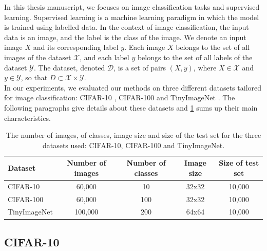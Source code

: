In this thesis manuscript, we focuses on image classification tasks and
supervised learning. Supervised learning is a machine learning paradigm in which
the model is trained using labelled data. In the context of image
classification, the input data is an image, and the label is the class of the
image. We denote an input image $X$ and its corresponding label $y$. Each image
$X$ belongs to the set of all images of the dataset $\mathcal{X}$, and each
label $y$ belongs to the set of all labels of the dataset $\mathcal{Y}$. The
dataset, denoted $\mathcal{D}$, is a set of pairs $(X, y)$, where $X \in
  \mathcal{X}$ and $y \in \mathcal{Y}$, so that $D \subset \mathcal{X} \times
  \mathcal{Y}$. \\

In our experiments, we evaluated our methods on three different datasets
tailored for image classification: CIFAR-10 \cite{CIFARdataset}, CIFAR-100
\cite{CIFARdataset} and TinyImageNet \cite{TinyImageNet}. The following
paragraphs give details about these datasets and \cref{tab:dlo:datasets} sums
up their main characteristics.\\

\begin{table}[ht!]
  \centering
  \begin{tabular}{lcccc}
    \toprule
    \textbf{Dataset}    & \textbf{Number of images} & \textbf{Number of classes} &
    \textbf{Image size} & \textbf{Size of test set}                                               \\
    \hline
    CIFAR-10            & 60,000                    & 10                         & 32x32 & 10,000 \\
    CIFAR-100           & 60,000                    & 100                        & 32x32 & 10,000 \\
    TinyImageNet        & 100,000                   & 200                        & 64x64 & 10,000 \\
    \bottomrule
  \end{tabular}
  \caption{The number of images, of classes, image size and size of the test
    set for the three datasets used: CIFAR-10, CIFAR-100 and TinyImageNet.}
  \label{tab:dlo:datasets}
\end{table}

\subsection{CIFAR-10}

